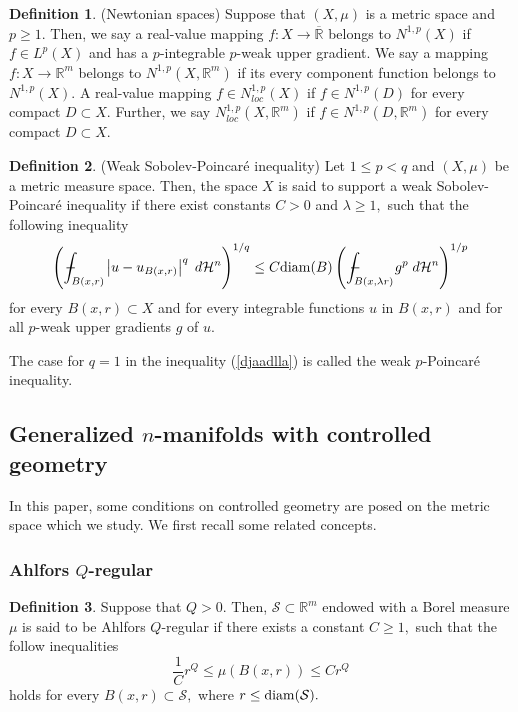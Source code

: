\documentclass[11pt,twoside]{article}
\theoremstyle{definition}
\newtheorem{defn}{Definition}[section]
\theoremstyle{remark}
\newcommand{\abs}[1]{\left|#1\right|}
\begin{document}
\begin{defn}(Newtonian spaces)\cite{Sha00}
Suppose that $(X,\mu)$ is a metric space and $p\geq1.$ Then, we say a real-value mapping $f:X\rightarrow\overline{\mathbb{R}}$ belongs to $N^{1,p}(X)$ if $f\in L^{p}(X)$ and has 
a $p$-integrable $p$-weak upper gradient. We say a mapping $f:X\rightarrow\mathbb{R}^{m}$ belongs to $N^{1,p}(X,\mathbb{R}^{m})$ if its every component function  belongs to $N^{1,p}(X).$
A real-value mapping $f\in N_{loc}^{1,p}(X)$ if $f\in N^{1,p}(D)$ for every compact $D\subset X.$ Further, we say $N_{loc}^{1,p}(X,\mathbb{R}^{m})$ if $f\in N^{1,p}(D,\mathbb{R}^{m})$ for every compact $D\subset X.$
\end{defn}




\begin{defn}(Weak Sobolev-Poincar\'{e} inequality)\cite{HKST01,HKST15}
Let $1\leq p<q$ and $(X,\mu)$ be a metric measure space. Then, the space $X$ is said to support a weak Sobolev-Poincar\'{e} inequality if there exist constants $C>0$ and $\lambda\geq1,$ such that the following inequality 
\begin{equation}\label{djaadlla}
\left(\int_{ B(x,r)}\!\!\!\!\!\!\!\!\!\!\!\!\!\!\!\!\!\!\!\!\!\; {}-{} \,\;\;\,\,\,\;\;\abs{u-u_{B(x,r)}}^{q}\;d\mathcal{H}^{n}\right)^{1/q}\leq C{\rm diam}(B)
\left(\int_{ B(x,\lambda r)}\!\!\!\!\!\!\!\!\!\!\!\!\!\!\!\!\!\!\!\!\!\!\!\; {}-{} \,\;\,\;\;\,\,\,\;\;g^{p}\;d\mathcal{H}^{n}\right)^{1/p}
\end{equation}
for every $B(x,r)\subset X$ and for every integrable functions $u$ in $B(x,r)$ and for all $p$-weak upper gradients $g$ of $u.$
\end{defn}
 
 
The case for $q=1$ in the inequality (\ref{djaadlla}) is called the weak $p$-Poincar\'{e} inequality. 

\subsection{Generalized $n$-manifolds with controlled geometry}
In this paper, some  conditions on controlled geometry are posed on the metric space which we study. We first recall some related concepts. 

\subsubsection{Ahlfors $Q$-regular}
\begin{defn}\cite{HS02}
Suppose that $Q>0.$ Then, $\mathcal{S}\subset \mathbb{R}^{m}$ endowed with a Borel measure $\mu$ is said to be Ahlfors $Q$-regular if there exists a constant $C\geq1,$ such that the follow inequalities 
\begin{equation}\label{shiojcks}
\frac{1}{C}r^{Q}\leq \mu(B(x,r))\leq C r^{Q}
\end{equation}
holds for every $B(x,r)\subset \mathcal{S},$ where $r\leq{\rm diam}(\mathcal{S}).$
\end{defn}
\end{document}
